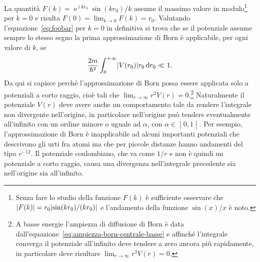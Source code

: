 \documentclass[a4paper,fleqn,twoside,12pt]{article}
\newcommand*{\dd}{\mathop{}\!\mathrm{d}} %
\DeclareMathOperator{\e}{\mathrm{e}} %
\DeclareMathOperator{\uimm}{\mathrm{i}} %
\DeclarePairedDelimiter{\abs}{\lvert}{\rvert}
\begin{document}
La quantità $F(k)=\e^{\uimm kr_{0}}\sin(kr_{0})/k$ assume il massimo valore in
modulo\footnote{Senza fare lo studio della funzione $F(k)$ è sufficiente
  osservare che $\abs{F(k)} = r_{0} \abs{\sin(kr_{0})/(kr_{0})}$ e l'andamento
  della funzione $\sin(x)/x$ è noto.}
per $k = 0$ e risulta $F(0) = \lim_{k \to 0} F(k) = r_{0}$.  Valutando
l'equazione~\eqref{eq:foobar} per $k=0$ in definitiva si trova che se il
potenziale assume sempre lo stesso segno la prima approssimazione di Born è
applicabile, per ogni valore di $k$, se
\begin{equation}
  \frac{2m}{\hslash^{2}}\int_{0}^{+\infty}\abs{V(r_{0})}r_{0}\dd r_{0} \ll 1.
\end{equation}
Da qui si capisce perché l'approssimazione di Born possa essere applicata solo a
potenziali a corto raggio, cioè tali che $\lim_{r \to \infty}r^{2}V(r) =
0$.\footnote{A
  basse energie l'ampiezza di diffusione di Born è data
  dall'equazione~\eqref{eq:ampiezza-born-centrale-basse} e affinché l'integrale
  converga il potenziale all'infinito deve tendere a zero ancora più
  rapidamente, in particolare deve risultare $\lim_{r \to \infty}r^{3}V(r) =
  0$.}
Naturalmente il potenziale $V(r)$ deve avere anche un comportamento tale da
rendere l'integrale non divergente nell'origine, in particolare nell'origine può
tendere eventualmente all'infinito con un ordine minore o uguale ad $\alpha$,
con $\alpha \in \mathopen{]}0, 1\mathclose{[}$.  Per esempio, l'approssimazione
di Born è inapplicabile ad alcuni importanti potenziali che descrivono gli urti
fra atomi ma che per piccole distanze hanno andamenti del tipo $r^{-12}$.  Il
potenziale coulombiano, che va come $1/r$ e non è quindi un potenziale a corto
raggio, causa una divergenza nell'integrale precedente sia nell'origine sia
all'infinito.
\end{document}
